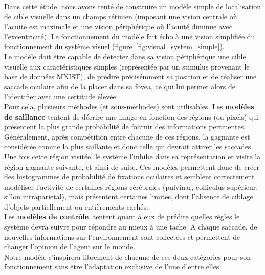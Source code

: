 Dans cette étude, nous avons tenté de construire un modèle simple de localisation de cible visuelle dans un champs rétinien (imposant une vision centrale où l'acuité est maximale et une vision périphérique où l'acuité diminue avec l'excentricité). Le fonctionnement du modèle fait écho à une vision simplifiée du fonctionnement du système visuel (figure~\ref{fig:visual_system_simple})\autocite{Zhaoping2014}.\\
Le modèle doit être capable de détecter dans sa vision périphérique une cible visuelle aux caractéristiques simples (représentée par un stimulus provenant le base de données MNIST), de prédire précisémment sa position et de réaliser une saccade oculaire afin de la placer dans sa fovea, ce qui lui permet alors de l'identifier avec une certitude élevée.\\
Pour cela, plusieurs méthodes (et sous-méthodes) sont utilisables.
Les \textbf{modèles de saillance} tentent de décrire une image en fonction des régions (ou pixels) qui présentent la plus grande probabilité de fournir des informations pertinentes. Généralement, après compétition entre chacune de ces régions, la gagnante est considérée comme la plus saillante et donc celle qui devrait attirer les saccades. Une fois cette région visitée, le système l'inhibe dans sa représentation et visite la région gagnante suivante, et ainsi de suite. Ces modèles permettent donc de créer des histogrammes de probabilité de fixations oculaires et semblent correctement modéliser l'activité de certaines régions cérébrales (pulvinar, colliculus supérieur, sillon intraparietal), mais présentent certaines limites, dont l'absence de ciblage d'objets partiellement ou entièrements cachés\autocite{Butko2010, Itti2000}.\\
Les \textbf{modèles de contrôle}, tentent quant à eux de prédire quelles règles le système devra suivre pour répondre au mieux à une tache. A chaque saccade, de nouvelles informations sur l'environnement sont collectées et permettent de changer l'opinion de l'agent sur le monde\autocite{Butko2010}.\\
Notre modèle s'inspirera librement de chacune de ces deux catégories pour son fonctionnement sans être l'adaptation exclusive de l'une d'entre elles.
